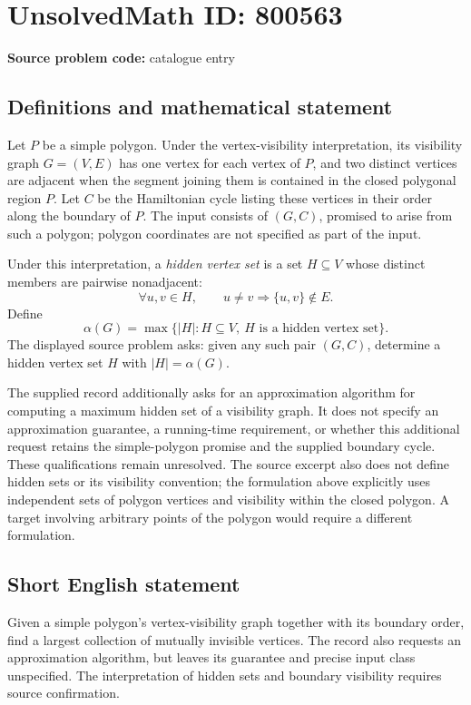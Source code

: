\documentclass[11pt]{article}
\begin{document}
\section*{UnsolvedMath ID: 800563}
\textbf{Source problem code:} catalogue entry
\subsection{Definitions and mathematical statement}
Let \(P\) be a simple polygon. Under the vertex-visibility interpretation, its visibility graph \(G=(V,E)\) has one vertex for each vertex of \(P\), and two distinct vertices are adjacent when the segment joining them is contained in the closed polygonal region \(P\). Let \(C\) be the Hamiltonian cycle listing these vertices in their order along the boundary of \(P\). The input consists of \((G,C)\), promised to arise from such a polygon; polygon coordinates are not specified as part of the input.

Under this interpretation, a \emph{hidden vertex set} is a set \(H\subseteq V\) whose distinct members are pairwise nonadjacent:
\[
\forall u,v\in H,\qquad u\ne v\Longrightarrow \{u,v\}\notin E.
\]
Define
\[
\alpha(G)=\max\bigl\{|H|:H\subseteq V,\ H\text{ is a hidden vertex set}\bigr\}.
\]
The displayed source problem asks: given any such pair \((G,C)\), determine a hidden vertex set \(H\) with \(|H|=\alpha(G)\).

The supplied record additionally asks for an approximation algorithm for computing a maximum hidden set of a visibility graph. It does not specify an approximation guarantee, a running-time requirement, or whether this additional request retains the simple-polygon promise and the supplied boundary cycle. These qualifications remain unresolved. The source excerpt also does not define hidden sets or its visibility convention; the formulation above explicitly uses independent sets of polygon vertices and visibility within the closed polygon. A target involving arbitrary points of the polygon would require a different formulation.
\subsection{Short English statement}
Given a simple polygon's vertex-visibility graph together with its boundary order, find a largest collection of mutually invisible vertices. The record also requests an approximation algorithm, but leaves its guarantee and precise input class unspecified. The interpretation of hidden sets and boundary visibility requires source confirmation.
\end{document}
